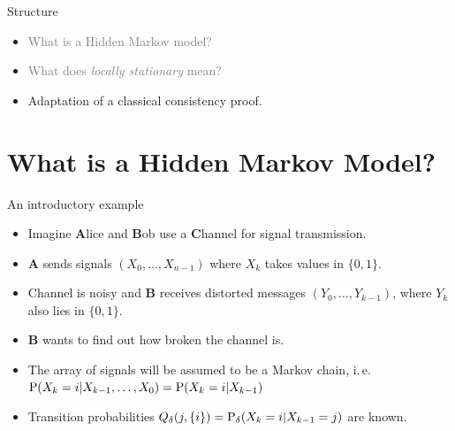 \begin{frame}{Structure}
	\begin{itemize}
		
		\item \textcolor{gray}{What is a Hidden Markov model?}
		\item \textcolor{gray}{What does \textit{locally stationary} mean?}
		\item Adaptation of a classical consistency proof.
	\end{itemize}
\end{frame}

\section{What is a Hidden Markov Model?}
\begin{frame}{An introductory example}
	\begin{itemize}
		\item Imagine \textbf{A}lice and \textbf{B}ob use a  \textbf{C}hannel for signal transmission.
		\item \textbf{A} sends signals $(X_0, \ldots, X_{n-1})$ where $X_k$ takes values in $\{0,1\}$. 
		\pause 
		\item Channel is noisy and \textbf{B} receives distorted messages $(Y_0, \ldots, Y_{k-1})$, where $Y_k$ also lies in $\{0,1\}$. 
		\item \textbf{B} wants to find out how broken the channel is.
		\pause
		\item The array of signals will be assumed to be a Markov chain, i.\,e. $\P(X_k = i | X_{k-1}, \ldots, X_{0}) =  \P(X_k = i | X_{k-1})$
		\item Transition probabilities $Q_\delta(j,\{i\}) = \P_\delta(X_k = i | X_{k-1}=j)$ are known. 
		\end{itemize}
\end{frame}

